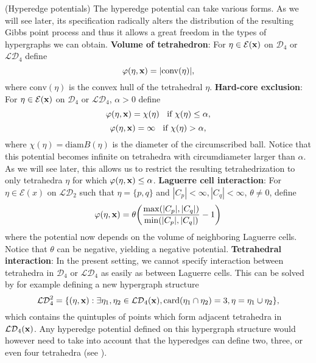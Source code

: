 \begin{ex}\label{ex:potentials}(Hyperedge potentials)
	The hyperedge potential can take various forms. As we will see later, its specification radically alters the distribution of the resulting Gibbs point process and thus it allows a great freedom in the types of hypergraphs we can obtain.\newline
	\textbf{Volume of tetrahedron}: For $\eta\in\mathcal E({\mathbf{x}})$ on $\mathcal D_4$ or $\mathcal {LD}_4$ define
	$$\varphi(\eta,{\mathbf{x}}) = |\mathrm{conv}(\eta)| ,$$
	where $\mathrm{conv}(\eta)$ is the convex hull of the tetrahedral $\eta$.	\newline
	\textbf{Hard-core exclusion}: For $\eta\in\mathcal E({\mathbf{x}})$ on $\mathcal D_4$ or $\mathcal {LD}_4$, $\alpha >0$ define
	$$\varphi(\eta,{\mathbf{x}}) = \chi(\eta)\;\; \text{ if } \chi(\eta) \leq \alpha,$$
	$$\varphi(\eta,{\mathbf{x}}) = \infty \;\; \text { if } \chi(\eta) > \alpha,$$
	where $\chi(\eta)= \mathrm{diam}B(\eta)$ is the diameter of the circumscribed ball. Notice that this potential becomes infinite on tetrahedra with circumdiameter larger than $\alpha$. As we will see later, this allows us to restrict the resulting tetrahedrization to only tetrahedra $\eta$ for which $\varphi(\eta,{\mathbf{x}}) \leq \alpha$.\newline
	\textbf{Laguerre cell interaction}: For $\eta \in \mathcal E(x)$ on $\mathcal {LD}_2$ such that $\eta=\{p,q\}$ and $|C_p| < \infty, |C_q| < \infty$, $\theta \neq 0$, define
$$\varphi(\eta,{\mathbf{x}}) = \theta \bigg (\frac {\max ( |C_p|, |C_q|)}{\min(|C_p|,|C_q|)} - 1\bigg)$$
where the potential now depends on the volume of neighboring Laguerre cells. Notice that $\theta$ can be negative, yielding a negative potential. \newline
\textbf{Tetrahedral interaction}: In the present setting, we cannot specify interaction between tetrahedra in $\mathcal D_4$ or $\mathcal {LD}_4$ as easily as between Laguerre cells. This can be solved by for example defining a new hypergraph structure
$$\mathcal {LD}^2_4 = \{(\eta,{\mathbf{x}}): \exists \eta_1,\eta_2\in\mathcal {LD}_4({\mathbf{x}}), \mathrm{card}(\eta_1 \cap \eta_2)=3, \eta = \eta_1 \cup \eta_2\},$$
which contains the quintuples of points which form adjacent tetrahedra in $\mathcal {LD}_4({\mathbf{x}})$. Any hyperedge potential defined on this hypergraph structure would however need to take into account that the hyperedges can define two, three, or even four tetrahedra (see \cite{Joe91}).
\end{ex}

